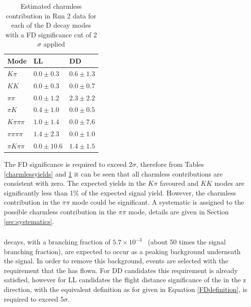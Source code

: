\begin{table}[h] 
\centering 
\begin{tabular}{lll} 
\hline 
Mode & LL & DD \\ 
\hline 
$K\pi$ & $0.0 \pm 0.3$ & $0.6 \pm 1.3$ \\ 
$KK$ & $0.0 \pm 0.3$ & $0.0 \pm 0.7$ \\ 
$\pi\pi$ & $0.0 \pm 1.2$ & $2.3 \pm 2.2$ \\ 
$\pi K$ & $0.4 \pm 1.0$ & $0.0 \pm 0.5$ \\ 
$K\pi\pi\pi$ & $1.0 \pm 1.4$ & $0.0 \pm 7.6$ \\ 
$\pi\pi\pi\pi$ & $1.4 \pm 2.3$ & $0.0 \pm 1.0$ \\ 
$\pi K \pi\pi$ & $0.0 \pm 10.6$ & $1.4 \pm 1.5$ \\ 
\hline 
\end{tabular} 
\caption{Estimated charmless contribution in Run 2 data for each of the D decay modes with a FD significance cut of 2$\sigma$ applied} 
\label{charmlessyieldsRun2}
\end{table}

The \Dz FD significance is required to exceed 2$\sigma$, therefore from Tables \ref{charmlessyields} and \ref{charmlessyieldsRun2} it can be seen that all charmless contributions are consistent with zero. The expected yields in the $K\pi$ favoured and $KK$ modes are significantly less than 1\% of the expected signal yield. However, the charmless contribution in the $\pi\pi$ mode could be significant. A systematic is assigned to the possible charmless contribution in the $\pi\pi$ mode, details are given in Section \ref{sec:systematics}. 

\subsubsection{\boldmath \decay{\B}{\D\pi\pi\pi}}
\label{sec:backgrounds:b2dpipipi}

\decay{\B}{\D\pi\pi\pi} decays, with a branching fraction of $5.7 \times 10^{-3}$~\cite{PDG2014} (about 50 times the signal branching fraction), are expected to occur as a peaking background underneath the signal. In order to remove this background, events are selected with the requirement that the \KS has flown. For DD candidates this requirement is already satisfied, however for LL candidates the flight distance significance of the \KS in the z direction, with the equivalent definition as for \Dz given in Equation \ref{FDdefinition}, is required to exceed 5$\sigma$. 

